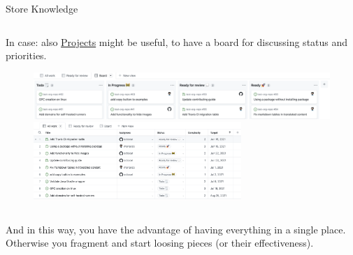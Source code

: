 \documentclass[9pt]{beamer}
\begin{document}
\begin{frame}{Store Knowledge}
\begin{columns}
\begin{column}{0.5\textwidth}
            In case: also
            \href{https://docs.github.com/en/issues/planning-and-tracking-with-projects/learning-about-projects/about-projects}{Projects}
            might be useful, to have a board for discussing status and
            priorities.
            \vspace*{10pt}

            \begin{figure}
                \centering
                \includegraphics[width=\textwidth]{board}
                \vspace*{10pt}
                \includegraphics[width=0.7\textwidth]{spreadsheet}
            \end{figure}
        \end{column}
    \end{columns}
    \vspace*{10pt}

    \begin{center}
    And in this way, you have the advantage of having everything in a single
    place.\\
    Otherwise you fragment and start loosing pieces (or their effectiveness).
    \end{center}
\end{frame}
\end{document}

